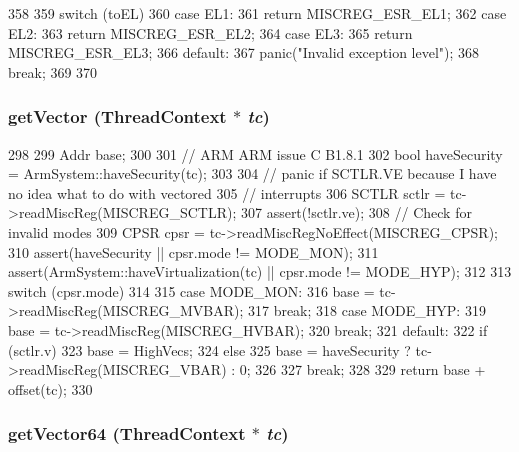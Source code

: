 \begin{DoxyCode}
358 {
359     switch (toEL) {
360       case EL1:
361         return MISCREG_ESR_EL1;
362       case EL2:
363         return MISCREG_ESR_EL2;
364       case EL3:
365         return MISCREG_ESR_EL3;
366       default:
367         panic("Invalid exception level");
368         break;
369     }
370 }
\end{DoxyCode}
\hypertarget{classArmISA_1_1ArmFault_a27f212dcc968f825450c87cfbc39eb37}{
\subsubsection[{getVector}]{ getVector ({\bf ThreadContext} $\ast$ {\em tc})}}
\label{classArmISA_1_1ArmFault_a27f212dcc968f825450c87cfbc39eb37}



\begin{DoxyCode}
298 {
299     Addr base;
300 
301     // ARM ARM issue C B1.8.1
302     bool haveSecurity = ArmSystem::haveSecurity(tc);
303 
304     // panic if SCTLR.VE because I have no idea what to do with vectored
305     // interrupts
306     SCTLR sctlr = tc->readMiscReg(MISCREG_SCTLR);
307     assert(!sctlr.ve);
308     // Check for invalid modes
309     CPSR cpsr = tc->readMiscRegNoEffect(MISCREG_CPSR);
310     assert(haveSecurity                      || cpsr.mode != MODE_MON);
311     assert(ArmSystem::haveVirtualization(tc) || cpsr.mode != MODE_HYP);
312 
313     switch (cpsr.mode)
314     {
315       case MODE_MON:
316         base = tc->readMiscReg(MISCREG_MVBAR);
317         break;
318       case MODE_HYP:
319         base = tc->readMiscReg(MISCREG_HVBAR);
320         break;
321       default:
322         if (sctlr.v) {
323             base = HighVecs;
324         } else {
325             base = haveSecurity ? tc->readMiscReg(MISCREG_VBAR) : 0;
326         }
327         break;
328     }
329     return base + offset(tc);
330 }
\end{DoxyCode}
\hypertarget{classArmISA_1_1ArmFault_add9243269fc0ab1dca2ea804c7fa2600}{
\subsubsection[{getVector64}]{ getVector64 ({\bf ThreadContext} $\ast$ {\em tc})}}
\label{classArmISA_1_1ArmFault_add9243269fc0ab1dca2ea804c7fa2600}




